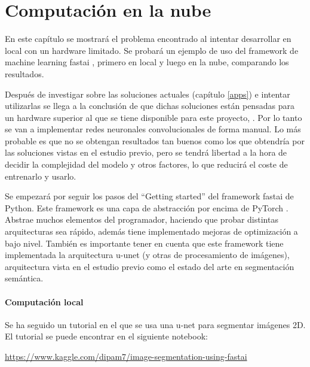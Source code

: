 \chapter{Computación en la nube}\label{cloudcomputing}

En este capítulo se mostrará el problema encontrado al intentar desarrollar en local con un hardware limitado. Se probará un ejemplo de uso del framework de machine learning fastai \cite{Howard2018}, primero en local y luego en la nube, comparando los resultados.

Después de investigar sobre las soluciones actuales (capítulo \ref{apps}) e intentar utilizarlas se llega a la conclusión de que dichas soluciones están pensadas para un hardware superior al que se tiene disponible para este proyecto, . Por lo tanto se van a implementar redes neuronales convolucionales de forma manual. Lo más probable es que no se obtengan resultados tan buenos como los que obtendría por las soluciones vistas en el estudio previo, pero se tendrá libertad a la hora de decidir la complejidad del modelo y otros factores, lo que reducirá el coste de entrenarlo y usarlo.

Se empezará por seguir los pasos del “Getting started” del framework fastai de Python. Este framework es una capa de abstracción por encima de PyTorch \cite{Paszke2019}. Abstrae muchos elementos del programador, haciendo que probar distintas arquitecturas sea rápido, además tiene implementado mejoras de optimización a bajo nivel. También es importante tener en cuenta que este framework tiene implementada la arquitectura u-unet (y otras de procesamiento de imágenes), arquitectura vista en el estudio previo como el estado del arte en segmentación semántica.

\subsubsection{Computación local}\label{sec:local_dev}

Se ha seguido un tutorial en el que se usa una u-net para segmentar imágenes 2D. El tutorial se puede encontrar en el siguiente notebook:

\url{https://www.kaggle.com/dipam7/image-segmentation-using-fastai}

